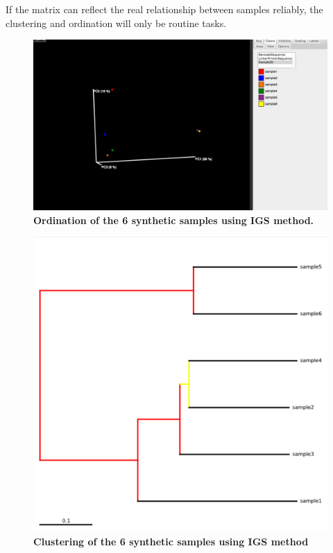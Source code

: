 \documentclass{article}
\begin{document}
If the matrix can reflect the real 
relationship between samples reliably, the clustering and ordination
will only be routine tasks.


\begin{figure}[!ht]
 \centerline{\includegraphics[width=6in]{./figures/simple_PCA_3d.png}}
\caption{\bf Ordination of the 6 synthetic samples using IGS method.}
\label{fig:simple_pcoa}
\end{figure}


\begin{figure}[!ht]
 \centerline{\includegraphics[width=6in]{./figures/simple_tree.png}}
\caption{\bf Clustering of the 6 synthetic samples using IGS method}
\label{fig:simple_cluster}
\end{figure}
\end{document}
